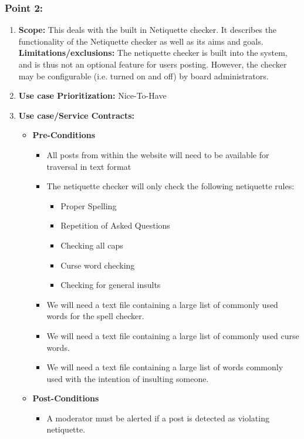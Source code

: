 \documentclass[11pt]{article}
\begin{document}
\subsubsection{Point 2: }
\begin{enumerate}
\item \textbf{Scope: }
This deals with the built in Netiquette checker. It describes the functionality of the Netiquette checker as well as its aims and goals.
\newline
\textbf{Limitations/exclusions:} 
The netiquette checker is built into the system, and is thus not an optional feature for users posting. However, the checker may be configurable (i.e. turned on and off) by board administrators.
\item 	\textbf{Use case Prioritization: } Nice-To-Have
\item 	\textbf{Use case/Service Contracts: }
		\begin{itemize}
			\item	\textbf{Pre-Conditions}
			\begin{itemize}
	  			\item All posts from within the website will need to be available for traversal in text format
	  			\item The netiquette checker will only check the following netiquette rules:
	  			\begin{itemize}
	  				\item Proper Spelling
	  				\item Repetition of Asked Questions
	  				\item Checking all caps
	  				\item Curse word checking
	  				\item Checking for general insults
	  			\end{itemize}
	  			\item We will need a text file containing a large list of commonly used words for the spell checker.
	  			\item We will need a text file containing a large list of commonly used curse words.
	  			\item We will need a text file containing a large list of words commonly used with the intention of insulting someone.
	  		\end{itemize}
	  		\item	\textbf{Post-Conditions}
	  		\begin{itemize}
	  			\item A moderator must be alerted if a post is detected as violating netiquette.

\end{itemize}
\end{itemize}
\end{enumerate}
\end{document}
